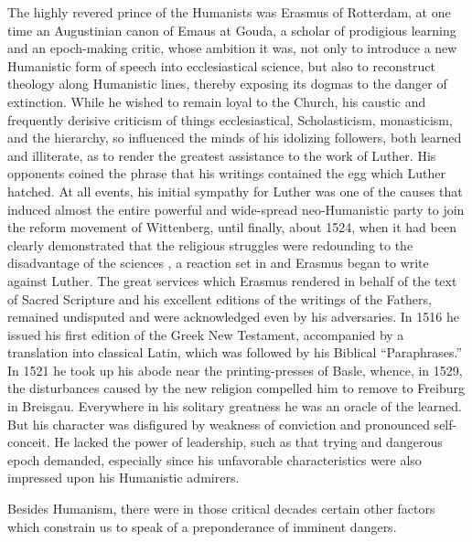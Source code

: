 The highly revered prince of the Humanists was Erasmus of
Rotterdam, at one time an Augustinian canon of Emaus at Gouda,
a scholar of prodigious learning and an epoch-making critic, whose
ambition it was, not only to introduce a new Humanistic form of
speech into ecclesiastical science, but also to reconstruct theology
along Humanistic lines, thereby exposing its dogmas to the danger
of extinction. While he wished to remain loyal to the Church, his
caustic and frequently derisive criticism of things ecclesiastical, Scholasticism,
monasticism, and the hierarchy, so influenced the minds
of his idolizing followers, both learned and illiterate, as to render
the greatest assistance to the work of Luther. His opponents coined
the phrase that his writings contained the egg which Luther hatched.
At all events, his initial sympathy for Luther was one of the causes
that induced almost the entire powerful and wide-spread neo-Humanistic
party to join the reform movement of Wittenberg, until
finally, about 1524, when it had been clearly demonstrated that the
religious struggles were redounding to the disadvantage of the sciences
, a reaction set in and Erasmus began to write against Luther.
The great services which Erasmus rendered in behalf of the text
of Sacred Scripture and his excellent editions of the writings of the
Fathers, remained undisputed and were acknowledged even by his
adversaries. In 1516 he issued his first edition of the Greek New
Testament, accompanied by a translation into classical Latin, which
was followed by his Biblical “Paraphrases.” In 1521 he took up his
abode near the printing-presses of Basle, whence, in 1529, the disturbances
caused by the new religion compelled him to remove to
Freiburg in Breisgau. Everywhere in his solitary greatness he was
an oracle of the learned. But his character was disfigured by weakness
of conviction and pronounced self-conceit. He lacked the power
of leadership, such as that trying and dangerous epoch demanded,
especially since his unfavorable characteristics were also impressed
upon his Humanistic admirers.

Besides Humanism, there were in those critical decades certain
other factors which constrain us to speak of a preponderance of
imminent dangers.

